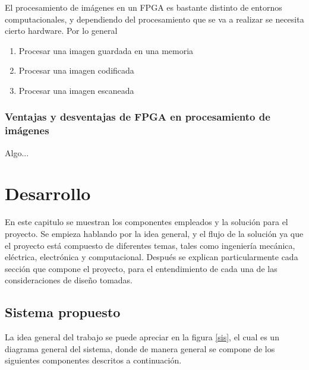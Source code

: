 \documentclass[twoside,spanish,ESP,MSc]{plantillaLabUPV}
\theoremstyle{definition}
\begin{document}
El procesamiento de imágenes en un FPGA es bastante distinto de entornos computacionales, y dependiendo del procesamiento que se va a realizar se necesita cierto hardware. Por lo general 

\begin{enumerate}
 \item Procesar una imagen guardada en una memoria
 \item Procesar una imagen codificada
 \item Procesar una imagen escaneada
\end{enumerate}



%

\subsection{Ventajas y desventajas de FPGA en procesamiento de imágenes}
Algo...






\chapter{Desarrollo}

En este capitulo se muestran los componentes empleados y la solución para el proyecto. Se empieza hablando por la idea general, y el flujo de la solución ya que el proyecto está compuesto de diferentes temas, tales como ingeniería mecánica, eléctrica, electrónica y computacional. Después se explican particularmente cada sección que compone el proyecto, para el entendimiento de cada una de las consideraciones de diseño tomadas.


\section{Sistema propuesto}
La idea general del trabajo se puede apreciar en la figura \ref{sis}, el cual es un diagrama general del sistema, donde de manera general se compone de los siguientes componentes descritos a continuación.
\end{document}
